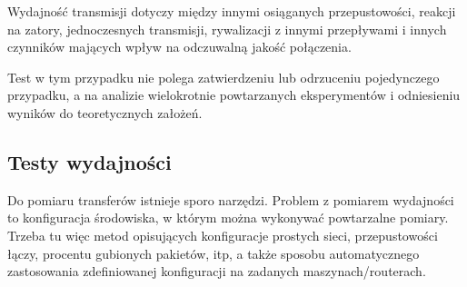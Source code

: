\documentclass[00-praca-magisterska.tex]{subfiles}
\begin{document}
Wydajność transmisji dotyczy między innymi osiąganych przepustowości, reakcji na
zatory, jednoczesnych transmisji, rywalizacji z innymi przepływami i innych
czynników mających wpływ na odczuwalną jakość połączenia.

Test w tym przypadku nie polega zatwierdzeniu lub odrzuceniu pojedynczego
przypadku, a na analizie wielokrotnie powtarzanych eksperymentów i odniesieniu
wyników do teoretycznych założeń.

\subsection{Testy wydajności}

Do pomiaru transferów istnieje sporo narzędzi. Problem z pomiarem
wydajności to konfiguracja środowiska, w którym można wykonywać
powtarzalne pomiary. Trzeba tu więc metod opisujących konfiguracje
prostych sieci, przepustowości łączy, procentu gubionych pakietów, itp,
a także sposobu automatycznego zastosowania zdefiniowanej konfiguracji
na zadanych maszynach/routerach.
\end{document}
